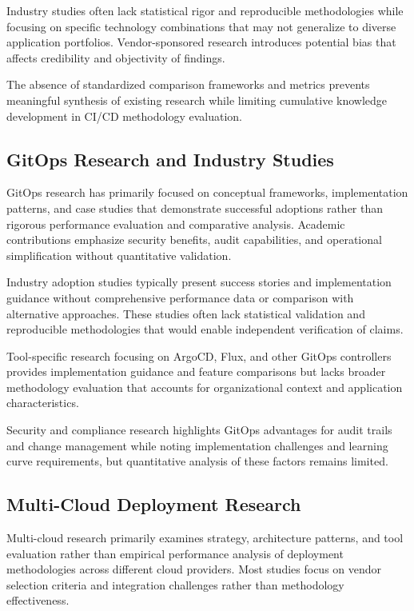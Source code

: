 Industry studies often lack statistical rigor and reproducible methodologies while focusing on specific technology combinations that may not generalize to diverse application portfolios. Vendor-sponsored research introduces potential bias that affects credibility and objectivity of findings.

The absence of standardized comparison frameworks and metrics prevents meaningful synthesis of existing research while limiting cumulative knowledge development in CI/CD methodology evaluation.

\subsection{GitOps Research and Industry Studies}

GitOps research has primarily focused on conceptual frameworks, implementation patterns, and case studies that demonstrate successful adoptions rather than rigorous performance evaluation and comparative analysis. Academic contributions emphasize security benefits, audit capabilities, and operational simplification without quantitative validation.

Industry adoption studies typically present success stories and implementation guidance without comprehensive performance data or comparison with alternative approaches. These studies often lack statistical validation and reproducible methodologies that would enable independent verification of claims.

Tool-specific research focusing on ArgoCD, Flux, and other GitOps controllers provides implementation guidance and feature comparisons but lacks broader methodology evaluation that accounts for organizational context and application characteristics.

Security and compliance research highlights GitOps advantages for audit trails and change management while noting implementation challenges and learning curve requirements, but quantitative analysis of these factors remains limited.

\subsection{Multi-Cloud Deployment Research}

Multi-cloud research primarily examines strategy, architecture patterns, and tool evaluation rather than empirical performance analysis of deployment methodologies across different cloud providers. Most studies focus on vendor selection criteria and integration challenges rather than methodology effectiveness.

